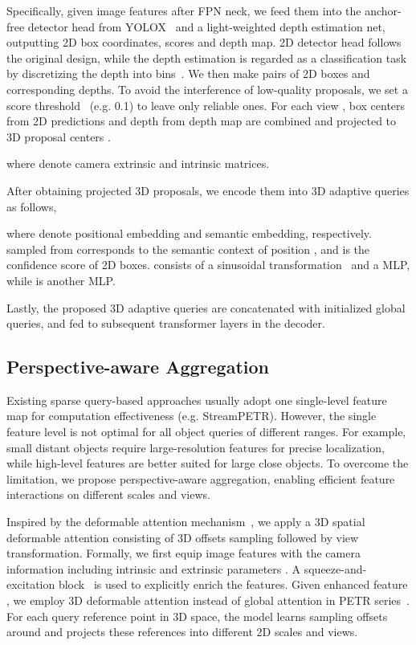 \documentclass[letterpaper]{article} \usepackage{aaai24}
\begin{document}
Specifically, given image features after FPN neck, we feed them into the anchor-free detector head from YOLOX~\cite{ge2021yolox} and a light-weighted depth estimation net, outputting 2D box coordinates, scores and depth map.
2D detector head follows the original design, while the depth estimation is regarded as a classification task by discretizing the depth into bins~\cite{reading2021categorical, zhang2022monodetr}.
We then make pairs of 2D boxes and corresponding depths. To avoid the interference of low-quality proposals, we set a score threshold ~(e.g. 0.1) to leave only reliable ones. For each view , box centers  from 2D predictions and depth  from depth map are combined and projected to 3D proposal centers .

where  denote camera extrinsic and intrinsic matrices.

After obtaining projected 3D proposals, we encode them into 3D adaptive queries as follows,



where  denote positional embedding and semantic embedding, respectively.  sampled from  corresponds to the semantic context of position , and  is the confidence score of 2D boxes.  consists of a sinusoidal transformation~\cite{vaswani2017attention} and a MLP, while  is another MLP. 

Lastly, the proposed 3D adaptive queries are concatenated with initialized global queries, and fed to subsequent transformer layers in the decoder. 

\subsection{Perspective-aware Aggregation}
Existing sparse query-based approaches usually adopt one single-level feature map for computation effectiveness (e.g. StreamPETR). However, the single feature level is not optimal for all object queries of different ranges. For example, small distant objects require large-resolution features for precise localization, while high-level features are better suited for large close objects.
To overcome the limitation, we propose perspective-aware aggregation, enabling efficient feature interactions on different scales and views. 

Inspired by the deformable attention mechanism~\cite{zhu2020deformable}, we apply a 3D spatial deformable attention consisting of 3D offsets sampling followed by view transformation. Formally, we first equip image features  with the camera information including intrinsic  and extrinsic parameters .
A squeeze-and-excitation block~\cite{hu2018squeeze} is used to explicitly enrich the features. 
Given enhanced feature , we employ 3D deformable attention instead of global attention in PETR series~\cite{liu2022petr, liu2022petrv2, wang2023exploring}. For each query reference point in 3D space, the model learns  sampling offsets around and projects these references into different 2D scales and views.
\end{document}
